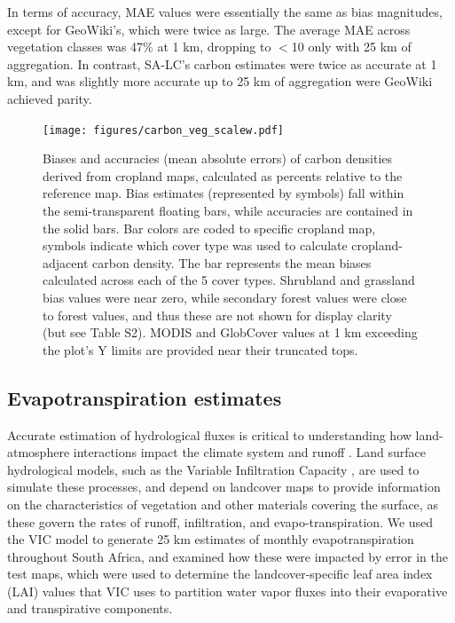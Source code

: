 \documentclass{pnastwo}
\begin{document}
\begin{article}
In terms of accuracy, MAE values were essentially the same as bias magnitudes, except for GeoWiki's, which were twice as large. The average MAE across vegetation classes was 47\% at 1 km, dropping to $<$10 only with 25 km of aggregation. In contrast, SA-LC's carbon estimates were twice as accurate at 1 km, and was slightly more accurate up to 25 km of aggregation were GeoWiki achieved parity.  

\vspace{-0.75 cm}
\begin{figure}[ht]
\centerline{\texttt{[image: figures/carbon\_veg\_scalew.pdf]}}
\caption{Biases and accuracies (mean absolute errors) of carbon densities derived from cropland maps, calculated as percents relative to the reference map. Bias estimates (represented by symbols) fall within the semi-transparent floating bars, while accuracies are contained in the solid bars. Bar colors are coded to specific cropland map, symbols indicate which cover type was used to calculate cropland-adjacent carbon density. The bar represents the mean biases calculated across each of the 5 cover types. Shrubland and grassland bias values were near zero, while secondary forest values were close to forest values, and thus these are not shown for display clarity (but see Table S2). MODIS and GlobCover values at 1 km exceeding the plot's Y limits are provided near their truncated tops.}
\label{afoto}
\end{figure}

\subsection{Evapotranspiration estimates}
Accurate estimation of hydrological fluxes is critical to understanding how land-atmosphere interactions impact the climate system and runoff \cite{liang_simple_1994}. Land surface hydrological models, such as the Variable Infiltration Capacity \cite{liang_simple_1994}, are used to simulate these processes, and depend on landcover maps to provide information on the characteristics of vegetation and other materials covering the surface, as these govern the rates of runoff, infiltration, and evapo-transpiration. We used the VIC model to generate 25 km estimates of monthly evapotranspiration throughout South Africa, and examined how these were impacted by error in the test maps, which were used to determine the landcover-specific leaf area index (LAI) values that VIC uses to partition water vapor fluxes into their evaporative and transpirative components. 


\end{article}
\end{document}
